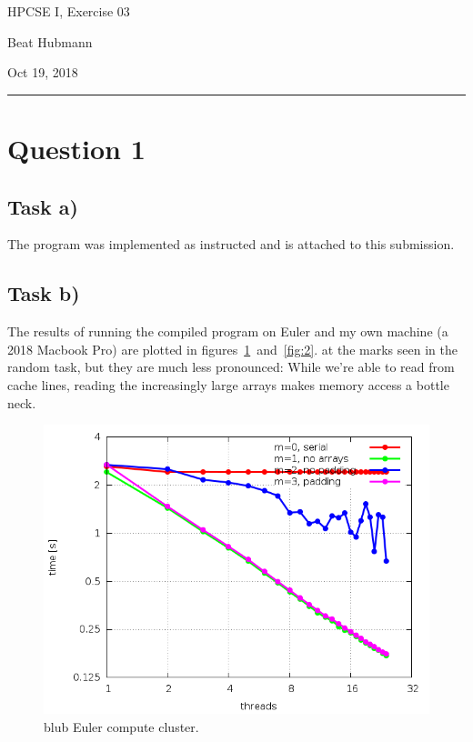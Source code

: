 \documentclass[11pt,a4paper]{article}
\begin{document}
\noindent\parbox{\linewidth}{
 \parbox{.25\linewidth}{ \large HPCSE I, Exercise 03 }\hfill
 \parbox{.5\linewidth}{\begin{center} \large Beat Hubmann \end{center}}\hfill
 \parbox{.2\linewidth}{\begin{flushright} \large Oct 19, 2018 \end{flushright}}
}
\noindent\rule{\linewidth}{2pt}

\section{Question 1}

\subsection{Task a)}

The program was implemented as instructed and is attached to this submission.

\subsection{Task b)}
The results of running the compiled program on Euler and my own machine (a 2018 Macbook Pro) are plotted in figures~\ref{fig:1}~and~\ref{fig:2}. at the marks seen in the random task, but they are much less pronounced: While we're able to read from cache lines, reading the increasingly large arrays makes memory access a bottle neck.


\begin{figure}[ht]
\begin{center}
\includegraphics[scale=0.5]{results.png} 
\end{center}
\caption{blub Euler compute cluster.}
\label{fig:1}
\end{figure}
\end{document}
